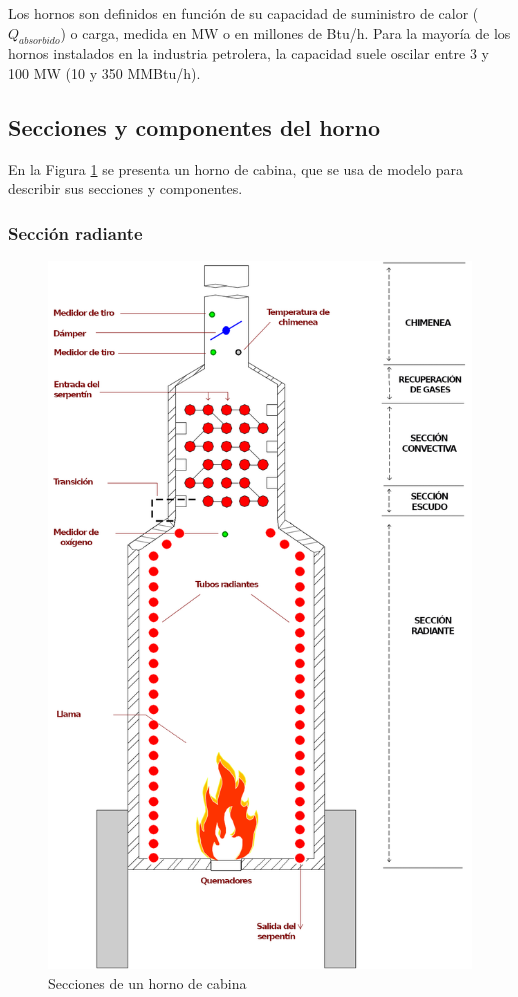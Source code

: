 \par Los hornos son definidos en función de su capacidad de suministro de calor ($Q_{absorbido}$) o carga, medida en MW o en millones de Btu/h. Para la mayoría de los hornos instalados en la industria petrolera, la capacidad suele oscilar entre 3 y 100 MW (10 y 350 MMBtu/h)\cite{bib:sandoval}.

\subsection{Secciones y componentes del horno}
\par En la Figura \ref{fig:horno} se presenta un horno de cabina, que se usa de modelo para describir sus secciones y componentes.

\subsubsection{Sección radiante}
\begin{figure} \begin{center}
\includegraphics[scale=0.38]{images/horno}
\caption[Secciones de un horno]{Secciones de un horno de cabina \cite{bib:thermox}}
\label{fig:horno} \end{center} \end{figure}
